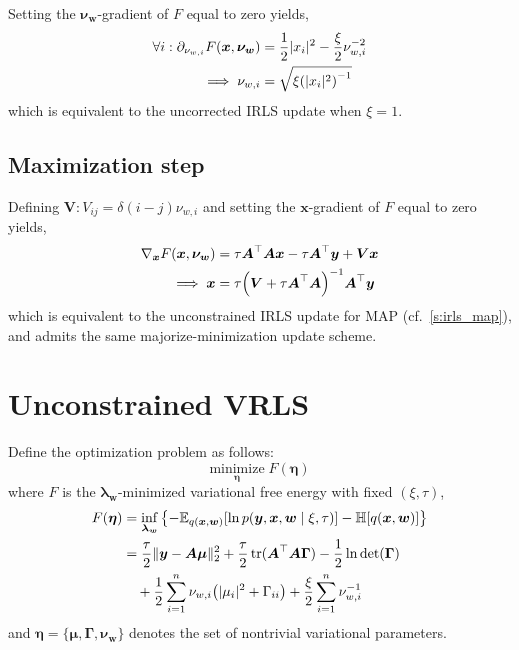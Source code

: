 \documentclass{article}
\numberwithin{equation}{section}
\newcommand{\lh}{\mathopen{}\mathclose\bgroup\left}
\newcommand{\rh}{\aftergroup\egroup\right}
\newcommand{\entropy}[1]{\mathbb{H}\lh[ #1 \rh]}
\newcommand{\E}[2]{\mathbb{E}_{#2}\lh[ #1 \rh]}
\newcommand{\m}[1]{\boldsymbol{#1}}
\DeclareMathOperator{\trace}{tr}
\begin{document}
Setting the $\m{\nu_w}$-gradient of $F$ equal to zero yields,
\begin{equation}
\begin{aligned}
\forall i: \partial_{\nu_{w,i}} F(\m{x}, \m{\nu_w}) &=
 \frac{1}{2} |x_i|^2 - \frac{\xi}{2} \nu_{w,i}^{-2}
\\ \implies
 \nu_{w,i} &= \sqrt{\xi \lh( |x_i|^2 \rh)^{-1}}
\end{aligned}
\end{equation}
which is equivalent to the uncorrected IRLS update when $\xi = 1$.

\subsection{Maximization step}
Defining $\m{V} : V_{ij} = \delta(i-j) \nu_{w,i}$ and setting the
$\m{x}$-gradient of $F$ equal to zero yields,
\begin{equation}
\begin{aligned}
\nabla_{\m{x}} F(\m{x}, \m{\nu_w}) &=
  \tau \m{A}^\top \m{A} \m{x} - \tau \m{A}^\top \m{y} + \m{V} \m{x}
\\ \implies
 \m{x} &= \tau \lh( \m{V} + \tau \m{A}^\top \m{A} \rh)^{-1}
 \m{A}^\top \m{y}
\end{aligned}
\end{equation}
which is equivalent to the unconstrained IRLS update for MAP
(cf.~\ref{s:irls_map}), and admits the same majorize-minimization
update scheme.

\clearpage
\section{Unconstrained VRLS}
\label{s:vrls}
Define the optimization problem as follows:
\begin{equation}
\underset{\m{\eta}}{\text{minimize}} \; F(\m{\eta})
\end{equation}
where $F$ is the $\m{\lambda_w}$-minimized variational free energy
with fixed $(\xi,\tau)$,
\begin{equation}
\begin{aligned}
F(\m{\eta}) &=
 \underset{\m{\lambda_w}}{\inf}\left\{
  -\E{\ln p(\m{y}, \m{x}, \m{w} \mid \xi, \tau)}{q(\m{x}, \m{w})}
  -\entropy{q(\m{x}, \m{w})}
 \right\}
\\ &=
  \frac{\tau}{2} \| \m{y} - \m{A} \m{\mu} \|_2^2
 +\frac{\tau}{2} \trace(\m{A}^\top \m{A} \m{\Gamma})
 -\frac{1}{2} \ln\det(\m{\Gamma})
\\ &\quad
 +\frac{1}{2} \sum_{i=1}^n \nu_{w,i} \lh( |\mu_i|^2 + \Gamma_{ii} \rh)
 +\frac{\xi}{2} \sum_{i=1}^n \nu_{w,i}^{-1}
\end{aligned}
\end{equation}
and $\m{\eta} = \{\m{\mu}, \m{\Gamma}, \m{\nu_w} \}$
denotes the set of nontrivial variational parameters.
\end{document}
